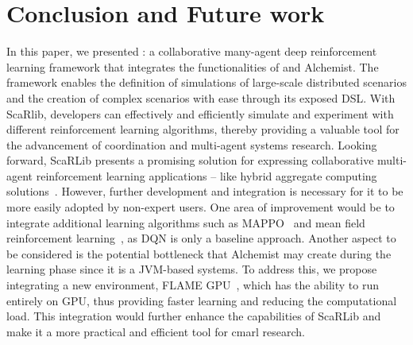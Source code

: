 \section{Conclusion and Future work}\label{conclusion}
In this paper, we presented \scarlib{}: 
 a collaborative many-agent deep reinforcement learning framework that integrates the functionalities of \scafi{} and Alchemist.
%
 The framework enables the definition of simulations of large-scale distributed scenarios 
 and the creation of complex scenarios with ease through its exposed DSL. 
% 
With ScaRlib, developers can effectively and efficiently simulate and experiment with different reinforcement learning algorithms, 
 thereby providing a valuable tool for the advancement of coordination and multi-agent systems research.
Looking forward, ScaRLib presents a promising solution 
 for expressing collaborative multi-agent reinforcement learning applications -- like hybrid aggregate computing solutions~\cite{Aguzzi2021,Aguzzi2022,Aguzzi2022-Roadmap,DBLP:conf/acsos/AguzziCV22}.
 However, further development and integration is necessary for it to be more easily adopted by non-expert users. 
 One area of improvement would be to integrate additional learning algorithms such as MAPPO~\cite{mappo} and mean field reinforcement learning~\cite{meanfield}, 
 as DQN is only a baseline approach.
%
Another aspect to be considered is the potential bottleneck that Alchemist may create during the learning phase since it is a JVM-based systems. 
%
To address this, we propose integrating a new environment, FLAME GPU~\cite{flame}, 
which has the ability to run entirely on GPU, 
thus providing faster learning and reducing the computational load. 
%
This integration would further enhance the capabilities of ScaRLib and make it a more practical and efficient tool for \ac{cmarl} research.



%
%
%
\printbibliography